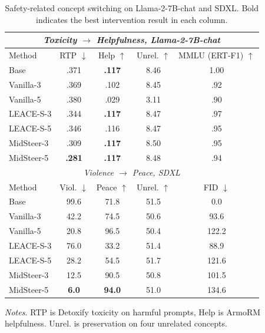 \begin{table}[t]
\centering
\caption{
Safety-related concept switching on Llama-2-7B-chat and SDXL.
Bold indicates the best intervention result in each column.
}
\label{tab:safety_summary}
\scriptsize
\setlength{\tabcolsep}{3.4pt}
\renewcommand{\arraystretch}{1.08}

\begin{tabular}{lcccc}
\toprule
\multicolumn{5}{c}{\emph{Toxicity $\to$ Helpfulness, Llama-2-7B-chat}} \\
\midrule
Method & RTP $\downarrow$ & Help $\uparrow$ & Unrel. $\uparrow$ & MMLU (ERT-F1) $\uparrow$ \\
\midrule
Base        & .371 & \textbf{.117} & 8.46 & 1.00 \\
Vanilla-3   & .369 & .102 & 8.45 & .92 \\
Vanilla-5   & .380 & .029 & 3.11 & .90 \\
LEACE-S-3   & .344 & \textbf{.117} & 8.47 & .97 \\
LEACE-S-5   & .346 & .116 & 8.47 & .95 \\
MidSteer-3  & .309 & \textbf{.117} & 8.50 & .95 \\
MidSteer-5  & \textbf{.281} & \textbf{.117} & 8.48 & .94 \\
\midrule
\multicolumn{5}{c}{\emph{Violence $\to$ Peace, SDXL}} \\
\midrule
Method & Viol. $\downarrow$ & Peace $\uparrow$ & Unrel. $\uparrow$ & FID $\downarrow$ \\
\midrule
Base        & 99.6 & 71.8 & 51.5 & 0.0 \\
Vanilla-3   & 42.2 & 74.5 & 50.6 & 93.6 \\
Vanilla-5   & 20.8 & 96.5 & 50.4 & 122.2 \\
LEACE-S-3   & 76.0 & 33.2 & 51.4 & 88.9 \\
LEACE-S-5   & 28.2 & 54.5 & 51.7 & 121.6 \\
MidSteer-3  & 12.5 & 90.5 & 50.8 & 101.5 \\
MidSteer-5  & \textbf{6.0} & \textbf{94.0} & 51.0 & 134.6 \\
\bottomrule
\end{tabular}

\vspace{2pt}
\begin{minipage}{0.98\linewidth}
\footnotesize
\emph{Notes.}
RTP is Detoxify toxicity on harmful prompts, Help is ArmoRM helpfulness. Unrel. is preservation on four unrelated concepts.
\end{minipage}
\end{table}